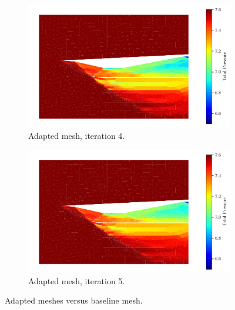 \begin{figure}[h!]
    \begin{subfigure}[h]{0.49\linewidth}
        \centering
        \includegraphics[width=\linewidth]{rep/q4/Pfield4.pdf}
        \caption{Adapted mesh, iteration 4.}
    \end{subfigure}
    \begin{subfigure}[h]{0.49\linewidth}
        \centering
        \includegraphics[width=\linewidth]{rep/q4/Pfield5.pdf}
        \caption{Adapted mesh, iteration 5.}
    \end{subfigure}
    \caption[Adapted Meshes Versus Baseline Mesh]{Adapted meshes versus baseline mesh.}
    \label{fig:adapted_meshes}
\end{figure}



\pagebreak
